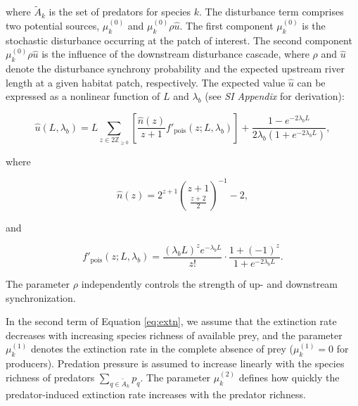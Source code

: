 \documentclass[11pt, class=article, crop=false]{standalone}
\begin{document}
where $\tilde{A}_{k}$ is the set of predators for species $k$.
The disturbance term comprises two potential sources, $\mu^{(0)}_k$ and $\mu^{(0)}_k \rho \hat{u}$.
The first component $\mu^{(0)}_k$ is the stochastic disturbance occurring at the patch of interest.
The second component $\mu^{(0)}_k \rho \hat{u}$ is the influence of the downstream disturbance cascade, where $\rho$ and $\hat{u}$ denote the disturbance synchrony probability and the expected upstream river length at a given habitat patch, respectively.
The expected value $\hat{u}$ can be expressed as a nonlinear function of $L$ and $\lambda_b$ (see \textit{SI Appendix} for derivation):

\begin{equation}
    \hat{u}(L, \lambda_b) = L \sum_{z \in 2\mathbb{Z}_{\ge 0}} \left[ \frac{\hat{n}(z)}{z + 1} f'_{\text{pois}}(z; L, \lambda_b)\right] + \frac{1 - e^{-2 \lambda_b L}}{2 \lambda_b (1 + e^{-2 \lambda_b L})},
\end{equation}

where

\begin{equation}
    \hat{n}(z) = 2^{z + 1} \binom{z + 1}{\frac{z + 2}{2}}^{-1} - 2,
\end{equation}

and

\begin{equation}
    f'_{\text{pois}}(z; L, \lambda_b) = \frac{(\lambda_b L)^z e^{-\lambda_b L}}{z!} \cdot \frac{1 + (-1)^{z}}{1 + e^{-2\lambda_b L}}.
\end{equation}

The parameter $\rho$ independently controls the strength of up- and downstream synchronization.

In the second term of Equation \ref{eq:extn}, we assume that the extinction rate decreases with increasing species richness of available prey, and the parameter $\mu_{k}^{(1)}$ denotes the extinction rate in the complete absence of prey ($\mu_{k}^{(1)} = 0$ for producers).
Predation pressure is assumed to increase linearly with the species richness of predators $\sum_{q \in \tilde{A}_{k}} p_{q}$.
The parameter $\mu_{k}^{(2)}$ defines how quickly the predator-induced extinction rate increases with the predator richness.
\end{document}

